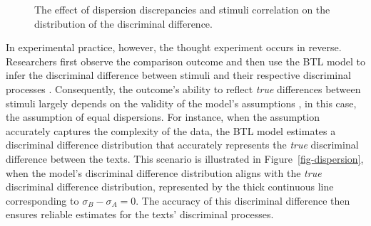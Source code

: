 \documentclass[
  authoryear,
  review,
  1p]{elsarticle}
\begin{document}
\begin{figure}

\begin{minipage}{0.50\linewidth}



\end{minipage}%
%
\begin{minipage}{0.50\linewidth}



\end{minipage}%

\caption{\label{fig-casev_issues}The effect of dispersion discrepancies
and stimuli correlation on the distribution of the discriminal
difference.}

\end{figure}%

In experimental practice, however, the thought experiment occurs in
reverse. Researchers first observe the comparison outcome and then use
the BTL model to infer the discriminal difference between stimuli and
their respective discriminal processes \citep{Thurstone_1927a}.
Consequently, the outcome's ability to reflect \emph{true} differences
between stimuli largely depends on the validity of the model's
assumptions \citep{Kohler_et_al_2019}, in this case, the assumption of
equal dispersions. For instance, when the assumption accurately captures
the complexity of the data, the BTL model estimates a discriminal
difference distribution that accurately represents the \emph{true}
discriminal difference between the texts. This scenario is illustrated
in Figure~\ref{fig-dispersion}, when the model's discriminal difference
distribution aligns with the \emph{true} discriminal difference
distribution, represented by the thick continuous line corresponding to
\(\sigma_{B}-\sigma_{A}=0\). The accuracy of this discriminal difference
then ensures reliable estimates for the texts' discriminal processes.
\end{document}
